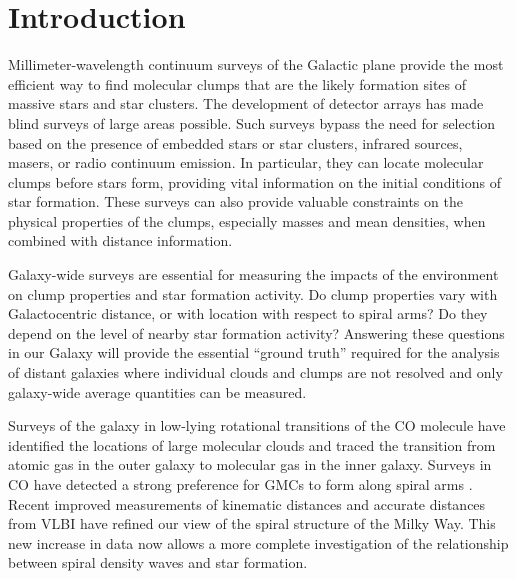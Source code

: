 \documentclass[12pt,preprint]{aastex}
\begin{document}

\newpage
\tableofcontents
\newpage
\listoffigures
\newpage
\listoftables
\newpage

\section{Introduction}
\label{sec:Introduction}

Millimeter-wavelength continuum surveys of the Galactic plane provide
the most efficient way to find molecular clumps that are the likely
formation sites of massive stars and star clusters. The development of
detector arrays has made blind surveys of large areas possible.  Such
surveys bypass the need for selection based on the presence of
embedded stars or star clusters, infrared sources, masers, or radio
continuum emission. In particular, they can locate molecular clumps
before stars form, providing vital information on the initial
conditions of star formation.  These surveys can also provide valuable
constraints on the physical properties of the clumps, especially
masses and mean densities, when combined with distance information.

Galaxy-wide surveys are essential for measuring the impacts of the
environment on clump properties and star formation activity.  Do clump
properties vary with Galactocentric distance, or with location with
respect to spiral arms?  Do they depend on the level of nearby star
formation activity?  Answering these questions in our Galaxy will
provide the essential ``ground truth'' required for the analysis of
distant galaxies where individual clouds and clumps are not resolved
and only galaxy-wide average quantities can be measured.

Surveys of the galaxy in low-lying rotational transitions of the CO
molecule \citep{dame01,jackson06} have identified the locations of
large molecular clouds and traced the transition from atomic gas in
the outer galaxy to molecular gas in the inner galaxy.  Surveys in CO
have detected a strong preference for GMCs to form along spiral arms
\citep{stark06}.  Recent improved measurements of kinematic distances
\citep[e.g.][]{RotationCurve} and accurate distances from VLBI
\citep{reid09} have refined our view of the spiral structure of the
Milky Way.  This new increase in data now allows a more complete
investigation of the relationship between spiral density waves and
star formation.
\end{document}
